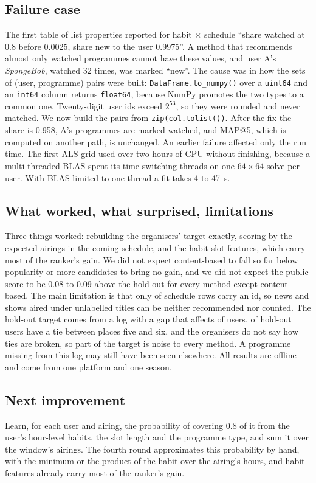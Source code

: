 \documentclass[conference]{IEEEtran}
\begin{document}
\subsection{Failure case}
The first table of list properties reported for habit $\times$ schedule ``share watched at 0.8 before 0.0025, share new to the user 0.9975''. A method that recommends almost only watched programmes cannot have these values, and user A's \emph{SpongeBob}, watched 32 times, was marked ``new''. The cause was in how the sets of (user, programme) pairs were built: \texttt{DataFrame.to\_numpy()} over a \texttt{uint64} and an \texttt{int64} column returns \texttt{float64}, because NumPy promotes the two types to a common one. Twenty-digit user ids exceed $2^{53}$, so they were rounded and never matched. We now build the pairs from \texttt{zip(col.tolist())}. After the fix the share is 0.958, A's programmes are marked watched, and MAP@5, which is computed on another path, is unchanged. An earlier failure affected only the run time. The first ALS grid used over two hours of CPU without finishing, because a multi-threaded BLAS spent its time switching threads on one $64\times64$ solve per user. With BLAS limited to one thread a fit takes 4 to 47~s.

\subsection{What worked, what surprised, limitations}
Three things worked: rebuilding the organisers' target exactly, scoring by the expected airings in the coming schedule, and the habit-slot features, which carry most of the ranker's gain. We did not expect content-based to fall so far below popularity or more candidates to bring no gain, and we did not expect the public score to be 0.08 to 0.09 above the hold-out for every method except content-based. The main limitation is that only \labRowsTrain{} of schedule rows carry an id, so news and shows aired under unlabelled titles can be neither recommended nor counted. The hold-out target comes from a log with a gap that affects \gapUsers{} of users. \tieShare{} of hold-out users have a tie between places five and six, and the organisers do not say how ties are broken, so part of the target is noise to every method. A programme missing from this log may still have been seen elsewhere. All results are offline and come from one platform and one season.

\subsection{Next improvement}
Learn, for each user and airing, the probability of covering 0.8 of it from the user's hour-level habits, the slot length and the programme type, and sum it over the window's airings. The fourth round approximates this probability by hand, with the minimum or the product of the habit over the airing's hours, and habit features already carry most of the ranker's gain.
\end{document}
